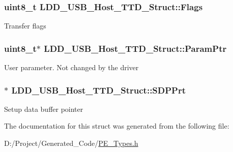 \subsubsection[{Flags}]{\setlength{\rightskip}{0pt plus 5cm}uint8\+\_\+t L\+D\+D\+\_\+\+U\+S\+B\+\_\+\+Host\+\_\+\+T\+T\+D\+\_\+\+Struct\+::\+Flags}\label{struct_l_d_d___u_s_b___host___t_t_d___struct_a083f54cb9e59a2206aca7d5481154c27}
Transfer flags \hypertarget{struct_l_d_d___u_s_b___host___t_t_d___struct_ab6fd6fdfe1e3e43cbdb5e1f2f61b3265}{}
\subsubsection[{Param\+Ptr}]{\setlength{\rightskip}{0pt plus 5cm}uint8\+\_\+t$\ast$ L\+D\+D\+\_\+\+U\+S\+B\+\_\+\+Host\+\_\+\+T\+T\+D\+\_\+\+Struct\+::\+Param\+Ptr}\label{struct_l_d_d___u_s_b___host___t_t_d___struct_ab6fd6fdfe1e3e43cbdb5e1f2f61b3265}
User parameter. Not changed by the driver \hypertarget{struct_l_d_d___u_s_b___host___t_t_d___struct_af1881ea197419558fdb55dc5f98ee446}{}
\subsubsection[{S\+D\+P\+Prt}]{$\ast$ L\+D\+D\+\_\+\+U\+S\+B\+\_\+\+Host\+\_\+\+T\+T\+D\+\_\+\+Struct\+::\+S\+D\+P\+Prt}\label{struct_l_d_d___u_s_b___host___t_t_d___struct_af1881ea197419558fdb55dc5f98ee446}
Setup data buffer pointer 

The documentation for this struct was generated from the following file\+:\begin{DoxyCompactItemize}
\item 
D\+:/\+Project/\+Generated\+\_\+\+Code/\hyperlink{_p_e___types_8h}{P\+E\+\_\+\+Types.\+h}\end{DoxyCompactItemize}
